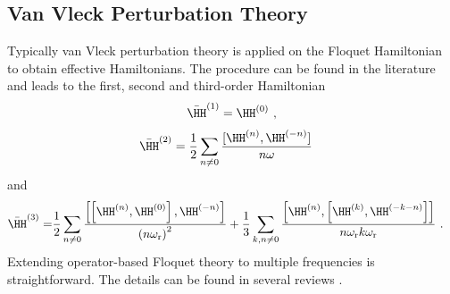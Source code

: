 \subsection{Van Vleck Perturbation Theory}
\enlargethispage{0.5cm}
Typically van Vleck perturbation theory is applied on the Floquet Hamiltonian to obtain effective Hamiltonians. The procedure can be found in the literature \cite{Ramesh:2001uz,Vinogradov:2001ui,Ernst:2005ic,Scholz:2007bs, Leskes:2010dx, Ivanov:2021uy} and leads to the first, second and third-order Hamiltonian
\begin{align}
\bar{\HH}^{(1)} = \HH^{(0)}~,
\end{align}
\begin{align}
&\bar{\HH}^{(2)} = \frac{1}{2}
\sum\limits_{n\neq 0}
\frac{[\HH^{(n)}
	,\HH^{(-n)}]}
{n \omega }
\end{align}
and
\begin{align}
\begin{split}
  {\bar{{\HH}}}^{\left( 3 \right)} =& \frac{1}{2}\sum\limits_{n \ne 0} {\frac{\left[ \left[ {{\HH}}^{(n)},{{\HH}}^{(0)} \right],{{\HH}}^{( - n)} \right]}{{\left( {n{\omega _{\mathrm{r}}}} \right)}^2}}  + \frac{1}{3}\sum\limits_{k,n \ne 0} {\frac{\left[ {{\HH}}^{(n)},\left[ {{\HH}}^{(k)},{{\HH}}^{( - k - n)} \right] \right]}{{n{\omega _{\mathrm{r}}}k{\omega _{\mathrm{r}}}}}}~.
\end{split}
  \end{align}
Extending operator-based Floquet theory to multiple frequencies is straightforward. The details can be found in several reviews \cite{Scholz:2010hq,Leskes:2010dx,Ivanov:2021uy}.
